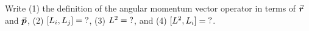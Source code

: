 

\vspace*{\fill}
\centering

Write (1) the definition of the angular momentum vector operator in terms of $\va*{r}$ and $\va*{p}$, (2) $[L_{i},L_{j}] = {\rm ?}$, (3) $L^2 = {\rm ?}$, and (4) $[L^2,L_{i}] = {\rm ?}$.

\centering
\vspace*{\fill}

